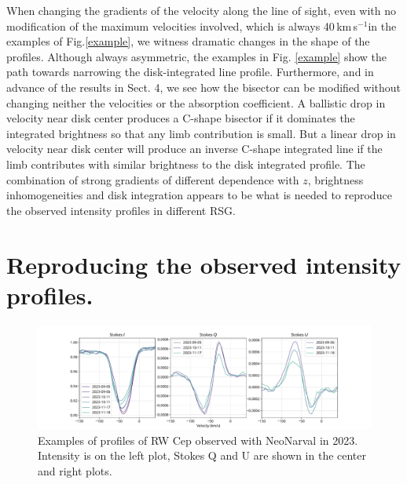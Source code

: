 \documentclass{/Users/art2/TeX/aanda/aa}
\def\kms {km\,s$^{-1}$}
\begin{document}
When changing the gradients of the velocity along the line of sight, even with no modification of the maximum velocities involved, which is 
always 40\,\kms in the examples of Fig.\ref{example}, we witness dramatic changes in the shape of the profiles. Although always asymmetric, the 
examples 
in Fig. \ref{example} show the path towards narrowing the disk-integrated line profile. Furthermore, and in advance of the results in Sect. 4, we see how the bisector can be modified without 
changing neither the velocities or the absorption 
coefficient. A ballistic drop in velocity near disk center produces a C-shape bisector if it dominates the integrated brightness so that any limb 
contribution is 
small. But a linear drop in velocity near disk center will produce an inverse C-shape integrated line if the limb contributes with similar brightness 
to the 
disk integrated profile. The combination of strong gradients of different dependence with $z$, brightness inhomogeneities and disk integration 
appears to be what is needed to reproduce the observed intensity profiles in different RSG.

\section{Reproducing the observed intensity profiles.}

\begin{figure}
   \includegraphics[width=\textwidth]{RWCep-LSD.pdf}
   \caption{ Examples of profiles of RW Cep observed with NeoNarval in 2023.  Intensity is on the left plot, Stokes Q and U are shown 
   in the center and right plots.}
   \label{observed}
   \end{figure}
\end{document}
